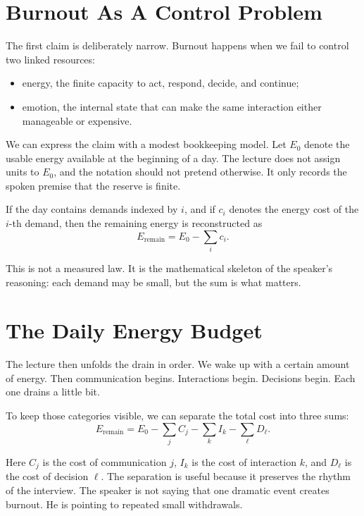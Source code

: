 \section{Burnout As A Control Problem}

The first claim is deliberately narrow. Burnout happens when we fail to control two linked resources:
\begin{itemize}
\item energy, the finite capacity to act, respond, decide, and continue;
\item emotion, the internal state that can make the same interaction either manageable or expensive.
\end{itemize}

We can express the claim with a modest bookkeeping model. Let \(E_0\) denote the usable energy available at the beginning of a day. The lecture does not assign units to \(E_0\), and the notation should not pretend otherwise. It only records the spoken premise that the reserve is finite.

If the day contains demands indexed by \(i\), and if \(c_i\) denotes the energy cost of the \(i\)-th demand, then the remaining energy is reconstructed as
\begin{equation}
E_{\mathrm{remain}}
=
E_0-\sum_i c_i .
\end{equation}

This is not a measured law. It is the mathematical skeleton of the speaker's reasoning: each demand may be small, but the sum is what matters.

\section{The Daily Energy Budget}

The lecture then unfolds the drain in order. We wake up with a certain amount of energy. Then communication begins. Interactions begin. Decisions begin. Each one drains a little bit.

To keep those categories visible, we can separate the total cost into three sums:
\begin{equation}
E_{\mathrm{remain}}
=
E_0
-
\sum_j C_j
-
\sum_k I_k
-
\sum_{\ell} D_{\ell}.
\end{equation}

Here \(C_j\) is the cost of communication \(j\), \(I_k\) is the cost of interaction \(k\), and \(D_{\ell}\) is the cost of decision \(\ell\). The separation is useful because it preserves the rhythm of the interview. The speaker is not saying that one dramatic event creates burnout. He is pointing to repeated small withdrawals.

